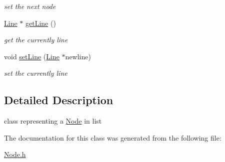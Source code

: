 \begin{DoxyCompactItemize}
\begin{DoxyCompactList}\small\item\em set the next node \item\end{DoxyCompactList}\item 
\hypertarget{classNode_aae10d78d7e3bc10e45ef5b1a8352ba3d}{
\hyperlink{classLine}{Line} $\ast$ \hyperlink{classNode_aae10d78d7e3bc10e45ef5b1a8352ba3d}{getLine} ()}
\label{classNode_aae10d78d7e3bc10e45ef5b1a8352ba3d}

\begin{DoxyCompactList}\small\item\em get the currently line \item\end{DoxyCompactList}\item 
\hypertarget{classNode_a10074db6adf27c27a2b4117b66bc00ee}{
void \hyperlink{classNode_a10074db6adf27c27a2b4117b66bc00ee}{setLine} (\hyperlink{classLine}{Line} $\ast$newline)}
\label{classNode_a10074db6adf27c27a2b4117b66bc00ee}

\begin{DoxyCompactList}\small\item\em set the currently line \item\end{DoxyCompactList}\end{DoxyCompactItemize}


\subsection{Detailed Description}
class representing a \hyperlink{classNode}{Node} in list 

The documentation for this class was generated from the following file:\begin{DoxyCompactItemize}
\item 
\hyperlink{Node_8h}{Node.h}\end{DoxyCompactItemize}
